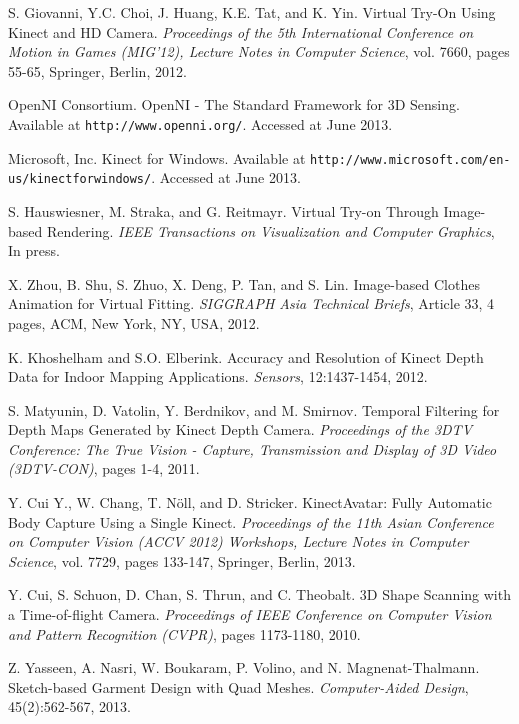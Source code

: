 \documentclass[number,preprint,review,12pt]{elsarticle}
\begin{document}
\begin{thebibliography}{}
S. Giovanni, Y.C. Choi, J. Huang, K.E. Tat, and K. Yin. Virtual Try-On Using Kinect and HD Camera. \textit{Proceedings of the 
5th International Conference on Motion in Games (MIG'12), Lecture Notes in Computer Science}, vol. 7660, pages 55-65, Springer, Berlin, 2012.

OpenNI Consortium. OpenNI - The Standard Framework for 3D Sensing. Available at \verb+http://www.openni.org/+. Accessed at June 2013.

Microsoft, Inc. Kinect for Windows. Available at \verb+http://www.microsoft.com/en-us/kinectforwindows/+. Accessed at June 2013.

S. Hauswiesner, M. Straka, and G. Reitmayr. Virtual Try-on Through Image-based Rendering. \textit{IEEE Transactions on Visualization
and Computer Graphics}, In press.

X. Zhou, B. Shu, S. Zhuo, X. Deng, P. Tan, and S. Lin. Image-based Clothes Animation for Virtual Fitting. \textit{SIGGRAPH Asia Technical Briefs}, Article 33, 4 pages, ACM, New York, NY, USA, 2012.

K. Khoshelham and S.O. Elberink. Accuracy and Resolution of Kinect Depth Data for Indoor Mapping Applications. \textit{Sensors}, 
12:1437-1454, 2012.

S. Matyunin, D. Vatolin, Y. Berdnikov, and M. Smirnov. Temporal Filtering for Depth Maps Generated by Kinect Depth Camera. 
\textit{Proceedings of the 3DTV Conference: The True Vision - Capture, Transmission and Display of 3D Video (3DTV-CON)}, pages 1-4,
2011.

Y. Cui Y., W. Chang, T. N\"{o}ll, and D. Stricker. KinectAvatar: Fully Automatic Body Capture Using a Single Kinect. 
\textit{Proceedings of the 11th Asian Conference on Computer Vision (ACCV 2012) Workshops, Lecture Notes in Computer Science}, 
vol. 7729, pages 133-147, Springer, Berlin, 2013.

Y. Cui, S. Schuon, D. Chan, S. Thrun, and C. Theobalt. 3D Shape Scanning with a Time-of-flight Camera. \textit{Proceedings of IEEE Conference on Computer Vision and Pattern Recognition (CVPR)}, pages 1173-1180, 2010.

Z. Yasseen, A. Nasri, W. Boukaram, P. Volino, and N. Magnenat-Thalmann. Sketch-based Garment Design with Quad Meshes. 
\textit{Computer-Aided Design}, 45(2):562-567, 2013.


\end{thebibliography}
\end{document}
